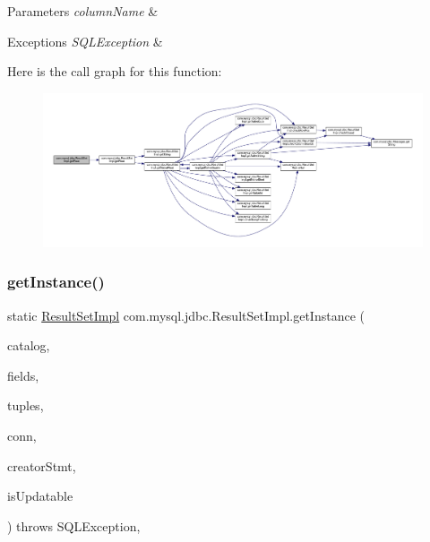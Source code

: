 \begin{DoxyParams}{Parameters}
{\em column\+Name} & \\
\hline
\end{DoxyParams}

\begin{DoxyExceptions}{Exceptions}
{\em S\+Q\+L\+Exception} & \\
\hline
\end{DoxyExceptions}
Here is the call graph for this function\+:
\nopagebreak
\begin{figure}[H]
\begin{center}
\leavevmode
\includegraphics[width=350pt]{classcom_1_1mysql_1_1jdbc_1_1_result_set_impl_a3414afd7b9d00effb055ef1fbfd03183_cgraph}
\end{center}
\end{figure}
\mbox{\label{classcom_1_1mysql_1_1jdbc_1_1_result_set_impl_a2b7230144634b4d3e651707a23fd5064}} 
\subsubsection{\texorpdfstring{get\+Instance()}{getInstance()}}
{\footnotesize\ttfamily static \mbox{\hyperlink{classcom_1_1mysql_1_1jdbc_1_1_result_set_impl}{Result\+Set\+Impl}} com.\+mysql.\+jdbc.\+Result\+Set\+Impl.\+get\+Instance (\begin{DoxyParamCaption}\item[{String}]{catalog,  }\item[{\mbox{\hyperlink{classcom_1_1mysql_1_1jdbc_1_1_field}{Field}} \mbox{[}$\,$\mbox{]}}]{fields,  }\item[{\mbox{\hyperlink{interfacecom_1_1mysql_1_1jdbc_1_1_row_data}{Row\+Data}}}]{tuples,  }\item[{\mbox{\hyperlink{interfacecom_1_1mysql_1_1jdbc_1_1_my_s_q_l_connection}{My\+S\+Q\+L\+Connection}}}]{conn,  }\item[{\mbox{\hyperlink{classcom_1_1mysql_1_1jdbc_1_1_statement_impl}{Statement\+Impl}}}]{creator\+Stmt,  }\item[{boolean}]{is\+Updatable }\end{DoxyParamCaption}) throws S\+Q\+L\+Exception\hspace{0.3cm}{\ttfamily [static]}, {\ttfamily [protected]}}

